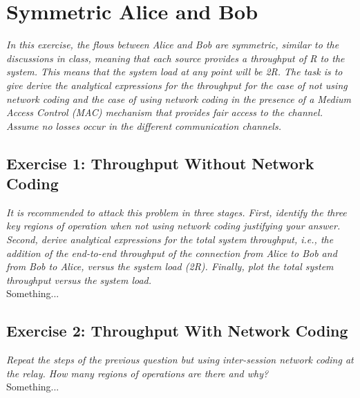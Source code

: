 \section{Symmetric Alice and Bob}
\textit{In this exercise, the flows between Alice and Bob are symmetric, similar to the discussions in class, meaning that each source provides a throughput of R to the system. This means that the system load at any point will be 2R. The task is to give derive the analytical expressions for the throughput for the case of not using network coding and the case of using network coding in the presence of a Medium Access Control (MAC) mechanism that provides fair access to the channel. Assume no losses occur in the different communication channels.}

\subsection{Exercise 1: Throughput Without Network Coding}
\textit{It is recommended to attack this problem in three stages. First, identify the three key regions of operation when not using network coding justifying your answer. Second, derive analytical expressions for the total system throughput, i.e., the addition of the end-to-end throughput of the connection from Alice to Bob and from Bob to Alice, versus the system load (2R). Finally, plot the total system throughput versus the system load.}\\

Something...

\subsection{Exercise 2: Throughput With Network Coding}
\textit{Repeat the steps of the previous question but using inter-session network coding at the relay. How many regions of operations are there and why?}\\

Something...


